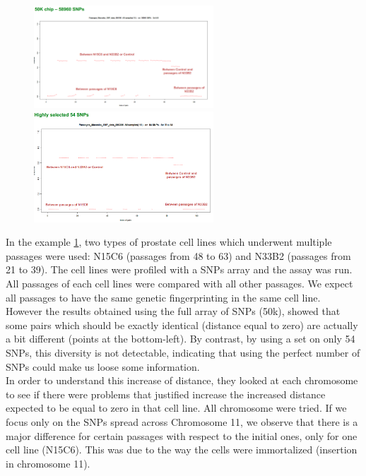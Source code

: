 \begin{figure}[H]
	\centering
	\includegraphics[width=0.6\textwidth]{50k.png}\quad\includegraphics[width=0.6\textwidth]{54_snps.PNG}
	\caption{}
	\label{fig: cell_lines}
\end{figure}


In the example \ref{fig: cell_lines}, two types of prostate cell lines which underwent multiple passages were used: N15C6 (passages from 48 to 63) and N33B2 (passages from 21 to 39).
The cell lines were profiled with a SNPs array and the assay was run.\\
All passages of each cell lines were compared with all other passages. We expect all passages to have the same genetic fingerprinting in the same cell line.
\\
However the results obtained using the full array of SNPs (50k), showed that some pairs which should be exactly identical (distance equal to zero) are actually a bit different (points at the bottom-left).
By contrast, by using a set on only 54 SNPs, this diversity is not detectable, indicating  that using the perfect number of SNPs could make us loose some information.
\\

In order to understand this increase of distance, they looked at each chromosome to see if there were problems that justified increase the increased distance expected to be equal to zero in that cell line. All chromosome were tried. If we focus only on the SNPs spread across Chromosome 11, we observe that there is a major difference for certain passages with respect to the initial ones, only for one cell line (N15C6). This was due to the way the cells were immortalized (insertion in chromosome 11).


